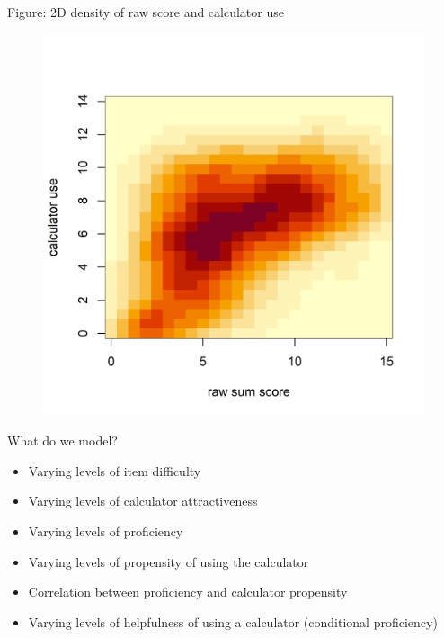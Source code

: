 \documentclass[xcolor=dvipsnames,12pt]{beamer}
\begin{document}
  \begin{frame}{Figure: 2D density of raw score and calculator use}
    \begin{figure}
      \includegraphics[scale = 0.5]{figures/cor_density.png}
    \end{figure}
  \end{frame}

  \begin{frame}{What do we model?}
    \begin{itemize}
      \item Varying levels of item difficulty 
      \item Varying levels of calculator attractiveness
      \item Varying levels of proficiency
      \item Varying levels of propensity of using the calculator
      \item Correlation between proficiency and calculator propensity
      \item Varying levels of helpfulness of using a calculator (conditional proficiency) 
    \end{itemize}
  \end{frame}
\end{document}

